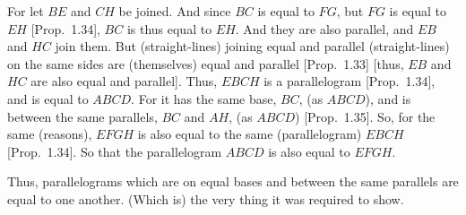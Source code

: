 \begin{Parallel}{}{}
{For let $BE$ and $CH$ be joined. And since $BC$ is equal to $FG$, but $FG$ is equal to $EH$ [Prop.~1.34], $BC$ is thus equal to $EH$. And they are also parallel, and $EB$ and $HC$ join them.
But (straight-lines) joining equal and parallel (straight-lines) on the
same sides are (themselves) equal and parallel [Prop.~1.33] [thus, $EB$ and $HC$
are also equal and parallel]. Thus, $EBCH$ is a parallelogram [Prop.~1.34],
and is equal to $ABCD$. For it has  the
same base, $BC$, (as $ABCD$), and is between the same parallels, $BC$ and $AH$, (as $ABCD$) [Prop.~1.35]. So,
for the same (reasons), $EFGH$ is also equal to the same (parallelogram) $EBCH$ [Prop.~1.34].  So that the
parallelogram $ABCD$ is  also equal to $EFGH$.

Thus, parallelograms which are on equal bases and between the same parallels are equal to one another. (Which is) the very thing it was required
to show.}
\end{Parallel}

